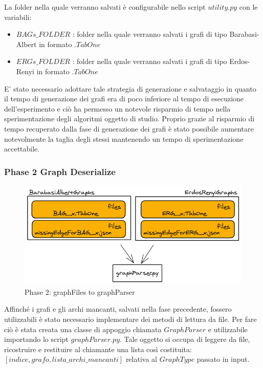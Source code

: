 \documentclass[a4paper]{article}
\begin{document}
La folder nella quale verranno salvati è configurabile nello script $utility.py$ con le variabili:
\begin{itemize}
\item $BAGs\_FOLDER$ : folder nella quale verranno salvati i grafi di tipo Barabasi-Albert in formato $.TabOne$
\item $ERGs\_FOLDER$ : folder nella quale verranno salvati i grafi di tipo Erdos-Renyi in formato $.TabOne$
\end{itemize}
E' stato necessario adottare tale strategia di generazione e salvataggio in quanto il tempo di generazione dei grafi era di poco inferiore al tempo di esecuzione dell'esperimento e ciò ha permesso un notevole risparmio di tempo nella sperimentazione degli algoritmi oggetto di studio.
Proprio grazie al risparmio di tempo recuperato dalla fase di generazione dei grafi è stato possibile aumentare notevolmente la taglia degli stessi mantenendo un tempo di sperimentazione accettabile.
\subsubsection{Phase 2 Graph Deserialize}
\begin{figure}[!h]
\includegraphics[scale=0.4]{img/02_graphFiles_to_graphParser}
\centering
\caption{Phase 2: graphFiles to graphParser}
\end{figure}
Affinché i grafi e gli archi mancanti, salvati nella fase precedente, fossero utilizzabili è stato necessario implementare dei metodi di lettura da file. Per fare ciò è stata creata una classe di appoggio chiamata $GraphParser$ e utilizzabile importando lo script $graphParser.py$. Tale oggetto si occupa di leggere da file, ricostruire e restituire al chiamante una lista così costituita: $[indice, grafo, lista\_archi\_mancanti]$ relativa al $GraphType$ passato in input.
\newpage
\end{document}
